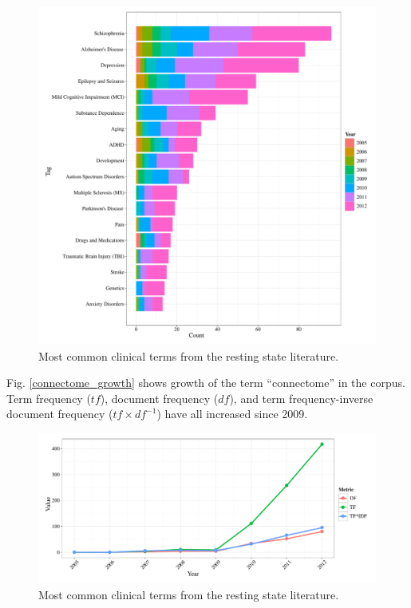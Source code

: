 \documentclass[5p]{elsarticle}
\begin{document}
\begin{figure}
  \begin{center}
    \includegraphics[width=\linewidth]{figures/clinical_bytag_hist}%
    \caption{Most common clinical terms from the resting state literature.
        \label{fig:clinical_bytag_hist}
    }
  \end{center}
\end{figure}

Fig. \ref{connectome_growth} shows growth of the term ``connectome'' in the
corpus. Term frequency ($t\!f$), document frequency ($d\!f$), and term
frequency-inverse document frequency ($t\!f \times d\!f^{-1}$) have all
increased since 2009.  

\begin{figure}
  \begin{center}
    \includegraphics[width=\linewidth]{figures/connectome_growth}%
    \caption{Most common clinical terms from the resting state literature.
        \label{fig:connectome_growth}
    }
  \end{center}
\end{figure}
\end{document}
